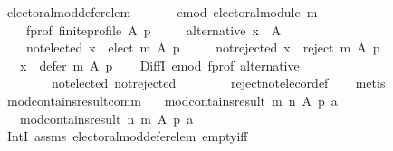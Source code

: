 \begin{isabellebody}
\ electoral{\isacharunderscore}{\kern0pt}mod{\isacharunderscore}{\kern0pt}defer{\isacharunderscore}{\kern0pt}elem{\isacharcolon}{\kern0pt}\isanewline
\ \ \isanewline
\ \ \ \ e{\isacharunderscore}{\kern0pt}mod{\isacharcolon}{\kern0pt}\ {\isachardoublequoteopen}electoral{\isacharunderscore}{\kern0pt}module\ m{\isachardoublequoteclose}\ \isanewline
\ \ \ \ f{\isacharunderscore}{\kern0pt}prof{\isacharcolon}{\kern0pt}\ {\isachardoublequoteopen}finite{\isacharunderscore}{\kern0pt}profile\ A\ p{\isachardoublequoteclose}\ \isanewline
\ \ \ \ alternative{\isacharcolon}{\kern0pt}\ {\isachardoublequoteopen}x\ {\isasymin}\ A{\isachardoublequoteclose}\ \isanewline
\ \ \ \ not{\isacharunderscore}{\kern0pt}elected{\isacharcolon}{\kern0pt}\ {\isachardoublequoteopen}x\ {\isasymnotin}\ elect\ m\ A\ p{\isachardoublequoteclose}\ \isanewline
\ \ \ \ not{\isacharunderscore}{\kern0pt}rejected{\isacharcolon}{\kern0pt}\ {\isachardoublequoteopen}x\ {\isasymnotin}\ reject\ m\ A\ p{\isachardoublequoteclose}\isanewline
\ \ \ {\isachardoublequoteopen}x\ {\isasymin}\ defer\ m\ A\ p{\isachardoublequoteclose}\isanewline
%
\isadelimproof
\ \ %
\endisadelimproof
%
\isatagproof
{}\isamarkupfalse%
\ DiffI\ e{\isacharunderscore}{\kern0pt}mod\ f{\isacharunderscore}{\kern0pt}prof\ alternative\isanewline
\ \ \ \ \ \ \ \ not{\isacharunderscore}{\kern0pt}elected\ not{\isacharunderscore}{\kern0pt}rejected\isanewline
\ \ \ \ \ \ \ \ reject{\isacharunderscore}{\kern0pt}not{\isacharunderscore}{\kern0pt}elec{\isacharunderscore}{\kern0pt}or{\isacharunderscore}{\kern0pt}def\isanewline
\ \ \isamarkupfalse%
\ metis%
\endisatagproof
{\isafoldproof}%
%
\isadelimproof
\isanewline
%
\endisadelimproof
\isanewline
{}\isamarkupfalse%
\ mod{\isacharunderscore}{\kern0pt}contains{\isacharunderscore}{\kern0pt}result{\isacharunderscore}{\kern0pt}comm{\isacharcolon}{\kern0pt}\isanewline
\ \ \ {\isachardoublequoteopen}mod{\isacharunderscore}{\kern0pt}contains{\isacharunderscore}{\kern0pt}result\ m\ n\ A\ p\ a{\isachardoublequoteclose}\isanewline
\ \ \ {\isachardoublequoteopen}mod{\isacharunderscore}{\kern0pt}contains{\isacharunderscore}{\kern0pt}result\ n\ m\ A\ p\ a{\isachardoublequoteclose}\isanewline
%
\isadelimproof
\ \ %
\endisadelimproof
%
\isatagproof
{}\isamarkupfalse%
\ IntI\ assms\ electoral{\isacharunderscore}{\kern0pt}mod{\isacharunderscore}{\kern0pt}defer{\isacharunderscore}{\kern0pt}elem\ empty{\isacharunderscore}{\kern0pt}iff\isanewline

\end{isabellebody}
